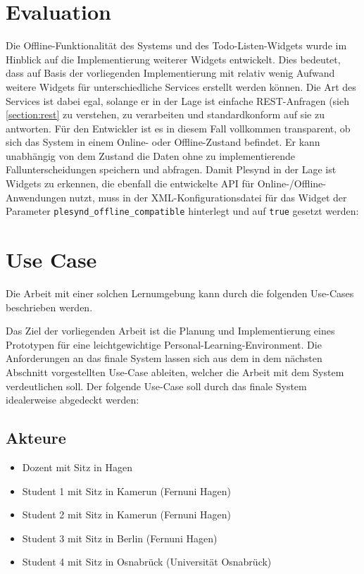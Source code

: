 \section{Evaluation}

Die Offline-Funktionalität des Systems und des Todo-Listen-Widgets wurde im Hinblick auf die Implementierung weiterer Widgets entwickelt. Dies bedeutet, dass auf Basis der vorliegenden Implementierung mit relativ wenig Aufwand weitere Widgets für unterschiedliche Services erstellt werden können. Die Art des Services ist dabei egal, solange er in der Lage ist einfache REST-Anfragen (sieh \ref{section:rest} zu verstehen, zu verarbeiten und standardkonform auf sie zu antworten. Für den Entwickler ist es in diesem Fall vollkommen transparent, ob sich das System in einem Online- oder Offline-Zustand befindet. Er kann unabhängig von dem Zustand die Daten ohne zu implementierende Fallunterscheidungen speichern und abfragen. Damit Plesynd in der Lage ist Widgets zu erkennen, die ebenfall die entwickelte API für Online-/Offline-Anwendungen nutzt, muss in der XML-Konfigurationsdatei für das Widget der Parameter \texttt{plesynd\_offline\_compatible} hinterlegt und auf \texttt{true} gesetzt werden:

\section{Use Case}

Die Arbeit mit einer solchen Lernumgebung kann durch die folgenden Use-Cases beschrieben werden.

Das Ziel der vorliegenden Arbeit ist die Planung und Implementierung eines Prototypen für eine leichtgewichtige Personal-Learning-Environment. Die Anforderungen an das finale System lassen sich aus dem in dem nächsten Abschnitt vorgestellten Use-Case ableiten, welcher die Arbeit mit dem System verdeutlichen soll.
Der folgende Use-Case soll durch das finale System idealerweise abgedeckt werden:

\subsection{Akteure}

\begin{itemize}
 \item Dozent mit Sitz in Hagen
 \item Student 1 mit Sitz in Kamerun (Fernuni Hagen)
 \item Student 2 mit Sitz in Kamerun (Fernuni Hagen)
 \item Student 3 mit Sitz in Berlin (Fernuni Hagen)
 \item Student 4 mit Sitz in Osnabrück (Universität Osnabrück) 
\end{itemize}

